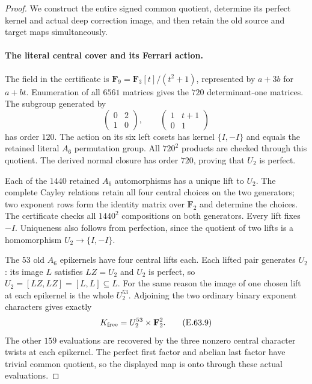 \begin{proof}
We construct the entire signed common quotient, determine
its perfect kernel and actual deep correction image, and
then retain the old source and target maps simultaneously.

\paragraph{The literal central cover and its Ferrari action.}
The field in the certificate is
$\mathbf F_9=\mathbf F_3[t]/(t^2+1)$, represented by
$a+3b$ for $a+bt$. Enumeration of all $6561$ matrices
gives the $720$ determinant-one matrices. The subgroup
generated by
\[
 \begin{pmatrix}0&2\\1&0\end{pmatrix},\qquad
 \begin{pmatrix}1&t+1\\0&1\end{pmatrix}
 \tag{E.63.8}
\]
has order $120$. The action on its six left cosets
has kernel $\{I,-I\}$ and equals the retained literal
$A_6$ permutation group. All $720^2$ products are
checked through this quotient. The derived normal
closure has order $720$, proving that $U_2$ is perfect.

Each of the $1440$ retained $A_6$ automorphisms has a
unique lift to $U_2$. The complete Cayley relations
retain all four central choices on the two generators;
two exponent rows form the identity matrix over
$\mathbf F_2$ and determine the choices. The certificate
checks all $1440^2$ compositions on both generators.
Every lift fixes $-I$. Uniqueness also follows from
perfection, since the quotient of two lifts is a
homomorphism $U_2\to\{I,-I\}$.

The $53$ old $A_6$ epikernels have four central lifts
each. Each lifted pair generates $U_2$: its image $L$
satisfies $LZ=U_2$ and $U_2$ is perfect, so
$U_2=[LZ,LZ]=[L,L]\subseteq L$. For the same reason
the image of one chosen lift at each epikernel is
the whole $U_2^{53}$. Adjoining the two ordinary
binary exponent characters gives exactly
\[
          K_{\rm free}=U_2^{53}\times\mathbf F_2^2.
 \tag{E.63.9}
\]
The other $159$ evaluations are recovered by the
three nonzero central character twists at each
epikernel. The perfect first factor and abelian last
factor have trivial common quotient, so the displayed
map is onto through these actual evaluations.


\end{proof}
